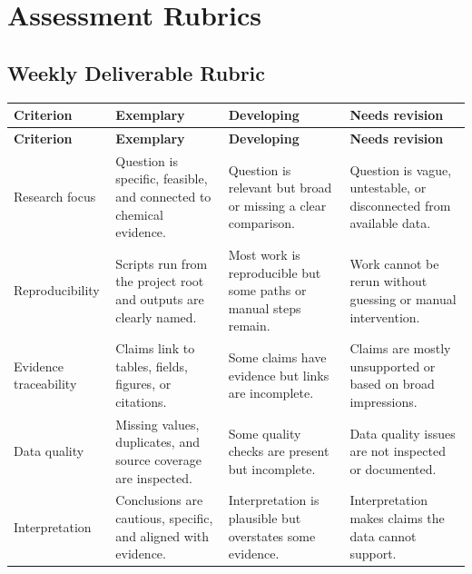 \chapter{Assessment Rubrics}

\section{Weekly Deliverable Rubric}
\begin{longtable}{p{}p{}p{}p{}}
\toprule
\textbf{Criterion} & \textbf{Exemplary} & \textbf{Developing} & \textbf{Needs revision}\\
\midrule
\endfirsthead
\toprule
\textbf{Criterion} & \textbf{Exemplary} & \textbf{Developing} & \textbf{Needs revision}\\
\midrule
\endhead
Research focus & Question is specific, feasible, and connected to chemical evidence. & Question is relevant but broad or missing a clear comparison. & Question is vague, untestable, or disconnected from available data.\\
Reproducibility & Scripts run from the project root and outputs are clearly named. & Most work is reproducible but some paths or manual steps remain. & Work cannot be rerun without guessing or manual intervention.\\
Evidence traceability & Claims link to tables, fields, figures, or citations. & Some claims have evidence but links are incomplete. & Claims are mostly unsupported or based on broad impressions.\\
Data quality & Missing values, duplicates, and source coverage are inspected. & Some quality checks are present but incomplete. & Data quality issues are not inspected or documented.\\
Interpretation & Conclusions are cautious, specific, and aligned with evidence. & Interpretation is plausible but overstates some evidence. & Interpretation makes claims the data cannot support.\\
\bottomrule
\end{longtable}

